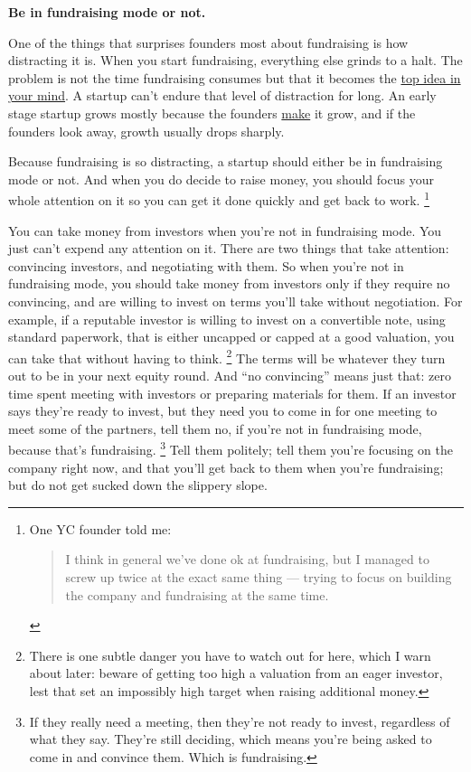 \documentclass[12pt]{book}
\begin{document}
\textbf{Be in fundraising mode or not.}

One of the things that surprises founders most about fundraising is how
distracting it is. When you start fundraising, everything else grinds to
a halt. The problem is not the time fundraising consumes but that it
becomes the \href{top.html}{top idea in your mind}. A startup can't
endure that level of distraction for long. An early stage startup grows
mostly because the founders \href{ds.html}{make} it grow, and if the
founders look away, growth usually drops sharply.

Because fundraising is so distracting, a startup should either be in
fundraising mode or not. And when you do decide to raise money, you
should focus your whole attention on it so you can get it done quickly
and get back to work. \footnote{One YC founder told me:

\begin{quote}
I think in general we've done ok at fundraising, but I managed to screw
up twice at the exact same thing --- trying to focus on building the
company and fundraising at the same time.
\end{quote}}

You can take money from investors when you're not in fundraising mode.
You just can't expend any attention on it. There are two things that
take attention: convincing investors, and negotiating with them. So when
you're not in fundraising mode, you should take money from investors
only if they require no convincing, and are willing to invest on terms
you'll take without negotiation. For example, if a reputable investor is
willing to invest on a convertible note, using standard paperwork, that
is either uncapped or capped at a good valuation, you can take that
without having to think. \footnote{There is one subtle danger you have to watch out for here, which
I warn about later: beware of getting too high a valuation from an eager
investor, lest that set an impossibly high target when raising
additional money.} The terms will be
whatever they turn out to be in your next equity round. And ``no
convincing'' means just that: zero time spent meeting with investors or
preparing materials for them. If an investor says they're ready to
invest, but they need you to come in for one meeting to meet some of the
partners, tell them no, if you're not in fundraising mode, because
that's fundraising. \footnote{If they really need a meeting, then they're not ready to invest,
regardless of what they say. They're still deciding, which means you're
being asked to come in and convince them. Which is fundraising.} Tell them politely; tell
them you're focusing on the company right now, and that you'll get back
to them when you're fundraising; but do not get sucked down the slippery
slope.
\end{document}
